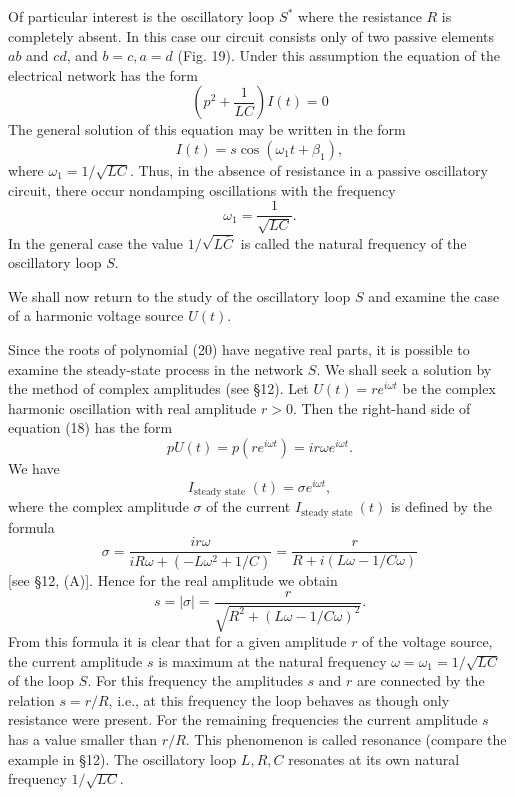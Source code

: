 \documentclass[10pt,a5paper]{book}
\theoremstyle{plain}
\theoremstyle{definition}
\theoremstyle{remark}
\begin{document}
Of particular interest is the oscillatory loop $S^{*}$ where the resistance $R$ is completely absent. In this case our circuit consists only of two passive elements $a b$ and $c d$, and $b=c, a=d$ (Fig. 19). Under this assumption the equation of the electrical network has the form
\[
\left(p^{2}+\frac{1}{L C}\right) I(t)=0
\]
The general solution of this equation may be written in the form
\[
I(t)=s \cos \left(\omega_{1} t+\beta_{1}\right),
\]
where $\omega_{1}=1 / \sqrt{L C}$. Thus, in the absence of resistance in a passive oscillatory circuit, there occur nondamping oscillations with the frequency
\[
\omega_{1}=\frac{1}{\sqrt{L C}} .
\]
In the general case the value $1 / \sqrt{L \bar{C}}$ is called the natural frequency of the oscillatory loop $S$.

We shall now return to the study of the oscillatory loop $S$ and examine the case of a harmonic voltage source $U(t)$.

Since the roots of polynomial (20) have negative real parts, it is possible to examine the steady-state process in the network $S$. We shall seek a solution by the method of complex amplitudes (see §12). Let $U(t)=r e^{i \omega t}$ be the complex harmonic oscillation with real amplitude $r>0$. Then the right-hand side of equation (18) has the form
\[
p U(t)=p\left(r e^{i \omega t}\right)=i r \omega e^{i \omega t} .
\]
We have
\[
I_{\text {steady state }}(t)=\sigma e^{i \omega t},
\]
where the complex amplitude $\sigma$ of the current $I_{\text {steady state }}(t)$ is defined by the formula
\[
\sigma=\frac{i r \omega}{i R \omega+\left(-L \omega^{2}+1 / C\right)}=\frac{r}{R+i(L \omega-1 / C \omega)}
\]
[see §12, (A)]. Hence for the real amplitude we obtain
\[
s=|\sigma|=\frac{r}{\sqrt{R^{2}+(L \omega-1 / C \omega)^{2}}} .
\]
From this formula it is clear that for a given amplitude $r$ of the voltage source, the current amplitude $s$ is maximum at the natural frequency $\omega=\omega_{1}=1 / \sqrt{L C}$ of the loop $S$. For this frequency the amplitudes $s$ and $r$ are connected by the relation $s=r / R$, i.e., at this frequency the loop behaves as though only resistance were present. For the remaining frequencies the current amplitude $s$ has a value smaller than $r / R$. This phenomenon is called resonance (compare the example in §12). The oscillatory loop $L, R, C$ resonates at its own natural frequency $1 / \sqrt{L C}$.
\end{document}
